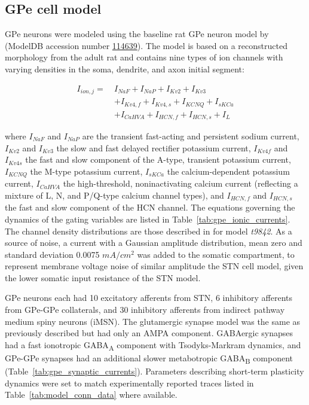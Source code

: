 %
\subsection{GPe cell model}

GPe neurons were modeled using the baseline rat GPe neuron model by \cite{gunay_channel_2008} (ModelDB accession number \href{https://senselab.med.yale.edu/modeldb/ShowModel.cshtml?model=114639}{114639}). The model is based on a reconstructed morphology from the adult rat and contains nine types of ion channels with varying densities in the soma, dendrite, and axon initial segment:

\begin{equation}
\begin{split}
    I_{ion,j} = \ & I_{NaF} + I_{NaP} + I_{Kv2} + I_{Kv3} \\
              & + I_{Kv4,f} + I_{Kv4,s} + I_{KCNQ} + I_{sKCa} \\
              & + I_{CaHVA} + I_{HCN,f} + I_{HCN,s} + I_{L}
\end{split}
\end{equation}

where $I_{NaF}$ and $I_{NaP}$ are the transient fast-acting and persistent sodium current, $I_{Kv2}$ and $I_{Kv3}$ the slow and fast delayed rectifier potassium current, $I_{Kv4f}$ and $I_{Kv4s}$ the fast and slow component of the A-type, transient potassium current, $I_{KCNQ}$ the M-type potassium current, $I_{sKCa}$ the calcium-dependent potassium current, $I_{CaHVA}$ the high-threshold, noninactivating calcium current (reflecting a mixture of L, N, and P/Q-type calcium channel types), and $I_{HCN,f}$ and $I_{HCN,s}$ the fast and slow component of the HCN channel. The equations governing the dynamics of the gating variables are listed in Table~\ref{tab:gpe_ionic_currents}. The channel density distributions are those described in \cite{gunay_channel_2008} for model \textit{t9842}.
%
As a source of noise, a current with a Gaussian amplitude distribution, mean zero and standard deviation 0.0075 $mA/cm^2$ was added to the somatic compartment, to represent membrane voltage noise of similar amplitude the STN cell model, given the lower somatic input resistance of the STN model.

GPe neurons each had 10 excitatory afferents from STN, 6 inhibitory afferents from GPe-GPe collaterals, and 30 inhibitory afferents from indirect pathway medium spiny neurons (iMSN). The glutamergic synapse model was the same as previously described but had only an AMPA component. GABAergic synapses had a fast ionotropic GABA\textsubscript{A} component with Tsodyks-Markram dynamics, and GPe-GPe synapses had an additional slower metabotropic GABA\textsubscript{B} component (Table~\ref{tab:gpe_synaptic_currents}). Parameters describing short-term plasticity dynamics were set to match experimentally reported traces
listed in Table~\ref{tab:model_conn_data} where available.
%


